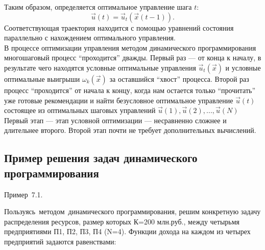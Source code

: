 \indent Таким образом, определяется оптимальное управление шага $t$:
 \begin{equation*}
 \vec{u}(t) =  \vec{u}_t(\vec{x}(t-1)).
\end{equation*}
\indent Соответствующая траектория находится с помощью уравнений состояния параллельно с нахождением оптимального управления.\\
\indent В процессе оптимизации управления методом динамического программирования многошаговый процесс “проходится” дважды. Первый раз — от конца к началу, в результате чего находятся условные оптимальные управления $\vec{u}_t(\vec{x})$  и условные оптимальные выигрыши $\omega_k(\vec{x})$  за оставшийся “хвост” процесса. Второй раз процесс “проходится” от начала к концу, когда нам остается только “прочитать” уже готовые рекомендации и найти безусловное оптимальное управление $\vec{u}(t)$ состоящее из оптимальных шаговых управлений $\vec{u}(1),\vec{u}(2),...,\vec{u}(N)$
Первый этап — этап условной оптимизации — несравненно сложнее и длительнее второго. Второй этап почти не требует дополнительных вычислений.
\subsection{Пример решения задач динамического программирования}
\indent\begin{bfseries} Пример~7.1.~\end{bfseries}
Пользуясь~методом~динамического программирования, решим конкретную задачу распределения ресурсов, размер которых К=200 млн.руб., между четырьмя предприятиями П1, П2, П3, П4 (N=4). Функции дохода на каждом из четырех предприятий задаются равенствами:

